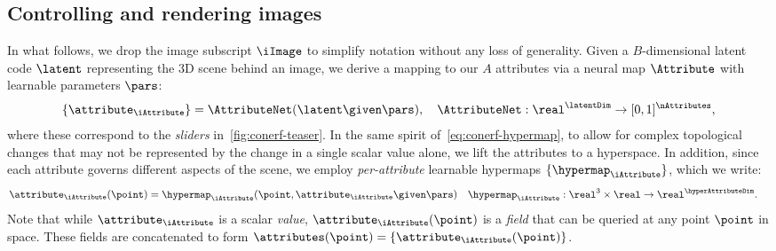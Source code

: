   \subsection{Controlling and rendering images}
    \label{sec:conerf-inference}
    In what follows, we drop the image subscript $\iImage$ to simplify notation
    without any loss of generality.
    Given a $B$-dimensional latent code $\latent$ representing the 3D scene behind an image, we derive a mapping to our $A$ attributes via a neural map $\Attribute$ with learnable parameters $\pars$:
    \begin{equation}
      \{ \attribute_\iAttribute \} = \AttributeNet(\latent \given \pars), \quad
      \AttributeNet : \real^\latentDim \rightarrow [0,1]^\nAttributes
      ,
    \end{equation}
    where these correspond to the \textit{sliders} in~\cref{fig:conerf-teaser}.
    In the same spirit of~\cref{eq:conerf-hypermap}, to allow for complex
    topological changes that may not be represented by the change in a single
    scalar value alone, we lift the attributes to a hyperspace.
    In addition, since each attribute governs different aspects of the scene, we employ \textit{per-attribute} learnable hypermaps $\{\hypermap_\iAttribute\}$, which we write:
    \begin{align}
      \attribute_\iAttribute(\point) & = \hypermap_\iAttribute(\point, \attribute_\iAttribute \given \pars) \quad \hypermap_\iAttribute: \real^3 \times \real \rightarrow \real^\hyperAttributeDim
      .
    \end{align}
    Note that while $\attribute_\iAttribute$ is a scalar \textit{value},
    $\attribute_\iAttribute(\point)$ is a \textit{field} that can be queried at
    any point $\point$ in space.
    These fields are concatenated to form
    $\attributes(\point)=\{\attribute_\iAttribute(\point)\}$.


